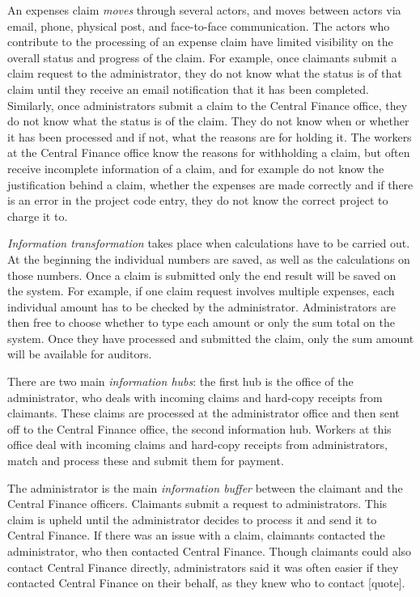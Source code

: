 An expenses claim \textit{moves} through several actors, and moves between actors via email, phone, physical post, and face-to-face communication. The actors who contribute to the processing of an expense claim have limited visibility on the overall status and progress of the claim. For example, once claimants submit a claim request to the administrator, they do not know what the status is of that claim until they receive an email notification that it has been completed. Similarly, once administrators submit a claim to the Central Finance office, they do not know what the status is of the claim. They do not know when or whether it has been processed and if not, what the reasons are for holding it. The workers at the Central Finance office know the reasons for withholding a claim, but often receive incomplete information of a claim, and for example do not know the justification behind a claim, whether the expenses are made correctly and if there is an error in the project code entry, they do not know the correct project to charge it to.

\textit{Information transformation} takes place when calculations have to be carried out. At the beginning the individual numbers are saved, as well as the calculations on those numbers. Once a claim is submitted only the end result will be saved on the system. For example, if one claim request involves multiple expenses, each individual amount has to be checked by the administrator. Administrators are then free to choose whether to type each amount or only the sum total on the system. Once they have processed and submitted the claim, only the sum amount will be available for auditors. 

There are two main \textit{information hubs}: the first hub is the office of the administrator, who deals with incoming claims and hard-copy receipts from claimants. These claims are processed at the administrator office and then sent off to the Central Finance office, the second information hub. Workers at this office deal with incoming claims and hard-copy receipts from administrators, match and process these and submit them for payment. 

The administrator is the main\textit{ information buffer }between the claimant and the Central Finance officers. Claimants submit a request to administrators. This claim is upheld until the administrator decides to process it and send it to Central Finance. If there was an issue with a claim, claimants contacted the administrator, who then contacted Central Finance. Though claimants could also contact Central Finance directly, administrators said it was often easier if they contacted Central Finance on their behalf, as they knew who to contact [quote]. 

